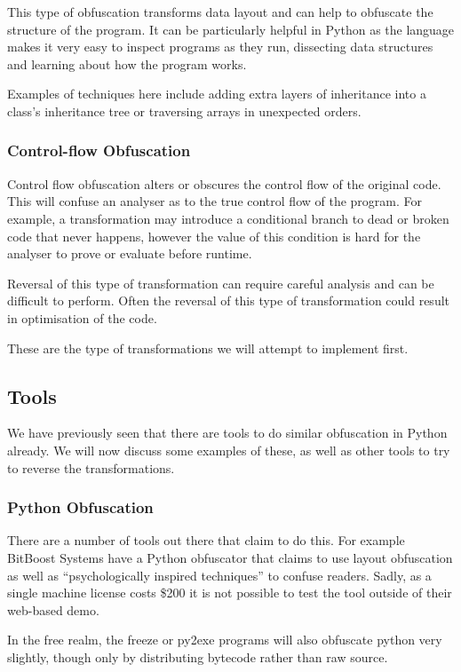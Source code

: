 \documentclass{report}
\begin{document}
This type of obfuscation transforms data layout and can help to obfuscate the structure of the program. It can be
particularly helpful in Python as the language makes it very easy to inspect programs as they run, dissecting data
structures and learning about how the program works.

Examples of techniques here include adding extra layers of inheritance into a class's inheritance tree or traversing arrays
in unexpected orders.

\subsubsection{Control-flow Obfuscation}

Control flow obfuscation alters or obscures the control flow of the original code. This will confuse an analyser as to the
true control flow of the program. For example, a transformation may introduce a conditional branch to dead or broken code
that never happens, however the value of this condition is hard for the analyser to prove or evaluate before runtime.

Reversal of this type of transformation can require careful analysis and can be difficult to perform. Often the reversal
of this type of transformation could result in optimisation of the code.

These are the type of transformations we will attempt to implement first.

\subsection{Tools}

We have previously seen that there are tools to do similar obfuscation in Python already. We will now discuss some
examples of these, as well as other tools to try to reverse the transformations.

\subsubsection{Python Obfuscation}

There are a number of tools out there that claim to do this. For example BitBoost Systems have a Python obfuscator \cite{bitboost}
that claims to use layout obfuscation as well as ``psychologically inspired techniques'' to confuse readers. Sadly, as a
single machine license costs \$200 it is not possible to test the tool outside of their web-based demo.

In the free realm, the freeze \cite{freezereadme} or py2exe \cite{py2exe} programs will also obfuscate python very slightly,
though only by distributing bytecode rather than raw source.
\end{document}
